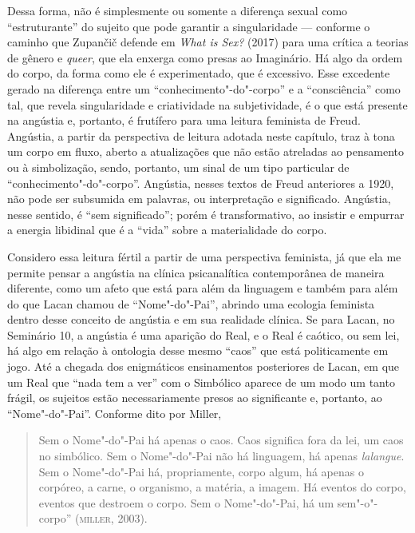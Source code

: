 Dessa forma, não é simplesmente ou somente a diferença sexual como
``estruturante'' do sujeito que pode garantir a singularidade ---
conforme o caminho que Zupančič defende em \emph{What is Sex?} (2017)
para uma crítica a teorias de gênero e \emph{queer}, que ela enxerga
como presas ao Imaginário. Há algo da ordem do corpo, da forma como ele
é experimentado, que é excessivo. Esse excedente gerado na diferença
entre um ``conhecimento"-do"-corpo'' e a ``consciência'' como tal, que
revela singularidade e criatividade na subjetividade, é o que está
presente na angústia e, portanto, é frutífero para uma leitura feminista
de Freud. Angústia, a partir da perspectiva de leitura adotada neste
capítulo, traz à tona um corpo em fluxo, aberto a atualizações que não
estão atreladas ao pensamento ou à simbolização, sendo, portanto, um
sinal de um tipo particular de ``conhecimento"-do"-corpo''. Angústia,
nesses textos de Freud anteriores a 1920, não pode ser subsumida em
palavras, ou interpretação e significado. Angústia, nesse sentido, é
``sem significado''; porém é transformativo, ao insistir e empurrar a
energia libidinal que é a ``vida'' sobre a materialidade do corpo.

Considero essa leitura fértil a partir de uma perspectiva feminista, já
que ela me permite pensar a angústia na clínica psicanalítica
contemporânea de maneira diferente, como um afeto que está para além da
linguagem e também para além do que Lacan chamou de ``Nome"-do"-Pai'',
abrindo uma ecologia feminista dentro desse conceito de angústia e em
sua realidade clínica. Se para Lacan, no Seminário 10, a angústia é uma
aparição do Real, e o Real é caótico, ou sem lei, há algo em relação à
ontologia desse mesmo ``caos'' que está politicamente em jogo. Até a
chegada dos enigmáticos ensinamentos posteriores de Lacan, em que um
Real que ``nada tem a ver'' com o Simbólico aparece de um modo um tanto
frágil, os sujeitos estão necessariamente presos ao significante e,
portanto, ao ``Nome"-do"-Pai''. Conforme dito por Miller,

\begin{quote}
Sem o Nome"-do"-Pai há apenas o caos. Caos significa fora da lei, um caos
no simbólico. Sem o Nome"-do"-Pai não há linguagem, há apenas
\emph{lalangue}. Sem o Nome"-do"-Pai há, propriamente, corpo algum, há
apenas o corpóreo, a carne, o organismo, a matéria, a imagem. Há eventos
do corpo, eventos que destroem o corpo. Sem o Nome"-do"-Pai, há um
sem"-o"-corpo'' (\textsc{miller}, 2003).
\end{quote}

